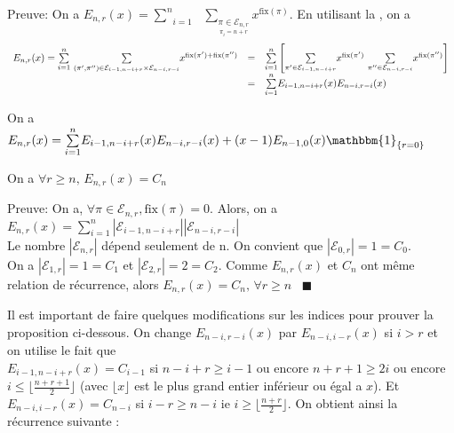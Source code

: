 Preuve: On a $E_{n,r}(x) =\underset{i=1}{\overset{n}{\sum}}\text{ }\underset{\underset{\pi_{i}=n+r}{\pi \in \mathcal{E}_{n,r}}}{\sum}x^{\text{fix}(\pi)}$.
En utilisant la , on a $$\begin{array}{l l l}
		E_{n,r}(x) = \underset{i=1}{\overset{n}{\sum}} \text{ } \underset{(\pi', \pi'') \in \mathcal{E}_{i-1,n-i+r}\times \mathcal{E}_{n-i,r-i}}{\sum}x^{\text{fix}(\pi') + \text{fix}(\pi'')} & = & \underset{i=1}{\overset{n}{\sum}}\left[ \underset{\pi' \in \mathcal{E}_{i-1,n-i+r}}{\sum}x^{\text{fix}(\pi')}\text{ }\underset{\pi'' \in \mathcal{E}_{n-i,r-i}}{\sum}x^{\text{fix}(\pi'')} \right] \\
		                                                                                                                                                                         & = & \underset{i=1}{\overset{n}{\sum}}E_{i-1,n-i+r}(x)E_{n-i,r-i}(x)
	\end{array}$$
\begin{corollaire}\label{c5}
	On a $E_{n, r}(x) = \underset{i=1}{\overset{n}{\sum}}E_{i-1, n-i+r}(x)E_{n-i, r-i}(x) + (x-1)E_{n-1,0}(x)\mathbbm{1}_{\{r=0\}}$
\end{corollaire}

\begin{proposition}
	On a $\forall r\geq n\text{, }E_{n,r}(x) = C_{n}$
\end{proposition}
Preuve:
On a, $ \forall \pi \in \mathcal{E}_{n, r}, \text{fix}(\pi)=0$. Alors, on a
$E_{n,r}(x)= \sum_{i=1}^{n}| \mathcal{E}_{i-1, n-i+r}||\mathcal{E}_{n-i, r-i}|$\\
Le nombre $|\mathcal{E}_{n, r}|$ dépend seulement de n. On convient que $|\mathcal{E}_{0, r}|=1=C_{0}$. \\On a  $|\mathcal{E}_{1, r}|=1=C_{1}$ et  $|\mathcal{E}_{2, r}|=2=C_{2}$. Comme $E_{n,r}(x)$ et $C_{n}$ ont même relation de récurrence, alors $E_{n,r}(x) = C_{n}\text{, }\forall r\geq n \hspace{10pt}\blacksquare$ \vspace{15pt}

Il est important de faire quelques modifications sur les indices pour prouver la proposition ci-dessous.
On change $E_{n-i,r-i}(x)$ par $E_{n-i,i-r}(x)$ si $i>r$ et on utilise le fait que\\ $E_{i-1,n-i+r}(x)=C_{i-1}$ si $n-i+r\geq i-1$ ou encore $n+r+1\geq 2i$
ou encore $i\leq \lfloor \frac{n+r+1}{2}\rfloor$ (avec $\lfloor x \rfloor$ est le plus grand entier inférieur ou égal a $x$). Et $E_{n-i,i-r}(x)=C_{n-i}$ si $i-r\geq n-i$ ie $i\geq \lfloor \frac{n+r}{2}\rfloor$. On obtient ainsi la récurrence suivante :


